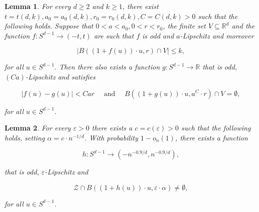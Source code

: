 \documentclass[10pt,a4paper]{amsart}
\newtheorem{lemma}{Lemma}
\newcommand{\Zcal}[0]{\ensuremath{{\mathcal Z}}}
\newcommand{\eR}[0]{\ensuremath{ \mathbb R}}
\newcommand{\eps}{\varepsilon}
\newcommand{\norm}[1]{\ensuremath{\left\|#1\right\|}}
\begin{document}
\begin{lemma}\label{lem:fg}
For every $d\geq 2$ and $k\geq 1$, there exist $t=t(d,k), a_0=a_0(d,k), r_0=r_0(d,k), C=C(d,k) > 0$ such 
that the following holds.
Suppose that $0 < a < a_0, 0 < r < r_0$, the finite set $V \subseteq \eR^d$
and the function $f :S^{d-1} \to (-t,t)$ are such that  
$f$ is odd and $a$-Lipschitz and moreover

$$ \left|B\left( (1+f(u))\cdot u, r \right) \cap V\right| \leq k, $$

\noindent
for all $u \in S^{d-1}$.
Then there also exists a function $g : S^{d-1} \to \eR$ that is odd, $(Ca)$-Lipschitz and satisfies 

$$ |f(u)-g(u)| < Car \quad \text{ and } \quad 
B\left( (1+g(u)) \cdot u, a^{C}\cdot r  \right) \cap V = \emptyset, $$

\noindent 
for all $u \in S^{d-1}$.
\end{lemma}

\begin{lemma}\label{lem:embed}
For every $\eps >0$ there exists a $c=c(\eps)>0$ such that the following holds, 
setting $\alpha = c \cdot n^{-1/d}$.
With probability $1-o_n(1)$, there exists a function 

$$ h : S^{d-1} \to \left(-n^{-0.9/d},n^{-0.9/d}\right),$$ 

\noindent
that is odd, $\eps$-Lipschitz and  

$$ \Zcal \cap B\left( (1+h(u))\cdot u, \eps\cdot\alpha \right) \neq \emptyset,$$ 

\noindent 
for all $u \in S^{d-1}$.
\end{lemma}
\end{document}
